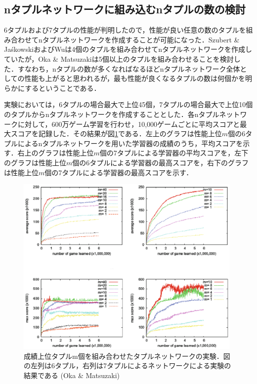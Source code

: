 \documentclass{suribt}
\begin{document}
\subsection{nタプルネットワークに組み込むnタプルの数の検討}
6タプルおよび7タプルの性能が判明したので，性能が良い任意の数のタプルを組み合わせてnタプルネットワークを作成することが可能になった．Szubert \& Ja\'{s}kowskiおよびWuは4個のタプルを組み合わせてnタプルネットワークを作成していたが，Oka \& Matsuzakiは5個以上のタプルを組み合わせることを検討した．すなわち，nタプルの数が多くなればなるほどnタプルネットワーク全体としての性能も上がると思われるが，最も性能が良くなるタプルの数は何個かを明らかにするということである．

実験においては，6タプルの場合最大で上位45個，7タプルの場合最大で上位10個のタプルからnタプルネットワークを作成することとした．各nタプルネットワークに対して，600万ゲーム学習を行わせ，10,000ゲームごとに平均スコアと最大スコアを記録した．その結果が図\ref{figure_005}である．左上のグラフは性能上位$m$個の6タプルによるnタプルネットワークを用いた学習器の成績のうち，平均スコアを示す．右上のグラフは性能上位$m$個の7タプルによる学習器の平均スコアを，左下のグラフは性能上位$m$個の6タプルによる学習器の最高スコアを，右下のグラフは性能上位$m$個の7タプルによる学習器の最高スコアを示す．

\begin{figure}[t]
	\begin{center}
	\includegraphics[width=11cm]{figure_005.eps}
	\caption{成績上位タプルm個を組み合わせたタプルネットワークの実験．図の左列は6タプル，右列は7タプルによるネットワークによる実験の結果である (Oka \& Matsuzaki)}
	\label{figure_005}
	\end{center}
\end{figure}
\end{document}
